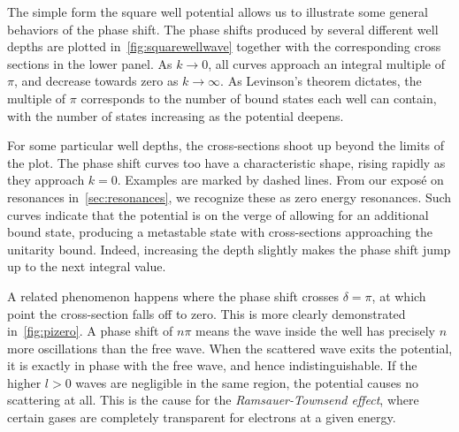 The simple form the square well potential allows us to illustrate some general
behaviors of the phase shift. The phase shifts produced by several
different well depths are plotted
in~\cref{fig:squarewellwave} together with the corresponding cross sections 
in the lower panel. As \(k\to 0\), all curves approach an integral multiple of
\(\pi\), and decrease towards zero as \(k\to \infty\). As
Levinson's theorem dictates, the multiple of \(\pi\) corresponds to the number
of bound states each well can contain, with
the number of states increasing as the potential deepens.

For some particular well depths, the cross-sections shoot up beyond the limits of
the plot. The phase shift curves too have a
characteristic shape, rising rapidly as they approach \(k=0\). Examples are marked by dashed
lines. From our expos\'e on resonances in~\cref{sec:resonances}, we recognize these
as zero energy resonances. Such curves indicate that the
potential is on the verge of allowing for an additional bound state, producing a
metastable state with cross-sections approaching the unitarity bound. Indeed, increasing the depth slightly makes the phase shift jump up
to the next integral value.

A related phenomenon happens where the phase shift crosses \(\delta=\pi\), at
which point the cross-section falls off to zero. This is more
clearly demonstrated in~\cref{fig:pizero}. A phase shift of \(n\pi\) means the wave inside
the well has precisely \(n\) more oscillations than the free wave. When the scattered
wave exits the potential, it is exactly in phase with the free wave, and hence
indistinguishable. If the higher \(l>0\) waves are negligible in the same region,
the potential causes no scattering at all. This is the cause for the
\textit{Ramsauer-Townsend effect}\cite[p.~195]{taylor}, where certain gases are completely
transparent for electrons at a given energy.

